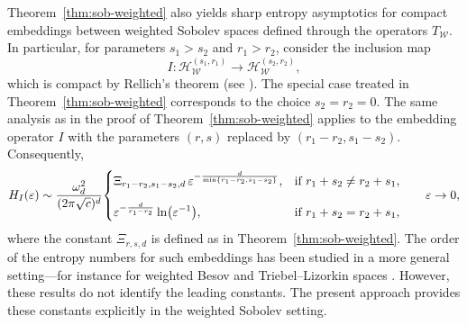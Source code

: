 \documentclass[a4paper,12pt]{article}
\let\originalleft\left
\let\originalright\right
\renewcommand{\left}{\mathopen{}\mathclose\bgroup\originalleft}
\renewcommand{\right}{\aftergroup\egroup\originalright}
\begin{document}
Theorem~\ref{thm:sob-weighted} also yields sharp entropy asymptotics for
compact embeddings between weighted Sobolev spaces defined through the
operators $T_{\mathcal W}$. In particular, for parameters $s_1>s_2$ and
$r_1>r_2$, consider the inclusion map
\[
I \colon \mathcal{H}_{\mathcal W}^{(s_1,r_1)}
\longrightarrow
\mathcal{H}_{\mathcal W}^{(s_2,r_2)} ,
\]
which is compact by Rellich’s theorem
(see \cite[Theorem~2.17 and Exercise~2.12]{hinzmicrolocal}).
The special case treated in Theorem~\ref{thm:sob-weighted}
corresponds to the choice $s_2=r_2=0$. The same analysis as in the proof of Theorem~\ref{thm:sob-weighted} applies to the
embedding operator $I$ with the parameters $(r,s)$ replaced by
$(r_1-r_2,s_1-s_2)$. Consequently, 
\begin{equation*}
    H_I(\varepsilon)
    \sim \frac{\omega_d^2}{(2\pi\sqrt{c})^{d}}
    \begin{dcases}
        \Xi_{r_1-r_2,s_1-s_2,d}\,
        \varepsilon^{-\frac{d}{\min\{r_1-r_2,s_1-s_2\}}},
        & \text{if } r_1+s_2 \neq r_2+s_1,\\[.25cm]
        \varepsilon^{-\frac{d}{r_1-r_2}}\ln \left(\varepsilon^{-1}\right),
        & \text{if } r_1+s_2 = r_2+s_1,
    \end{dcases}
    \qquad \varepsilon\to 0,
\end{equation*}
where the constant $\Xi_{r,s,d}$ is defined as in
Theorem~\ref{thm:sob-weighted}. The order of the entropy numbers for such embeddings has been studied
in a more general setting—for instance for weighted Besov and
Triebel–Lizorkin spaces \cite[Theorem~4.3.2]{edmundsFunctionSpacesEntropy1996}.
However, these results do not identify the leading constants.
The present approach provides these constants explicitly in the weighted
Sobolev setting.

\end{document}

